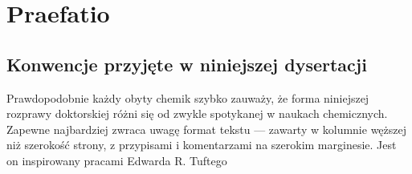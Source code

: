\chapter{Praefatio}
\section{Konwencje przyjęte w niniejszej dysertacji}

Prawdopodobnie każdy obyty chemik szybko zauważy, że forma niniejszej rozprawy doktorskiej różni się od zwykle spotykanej w naukach chemicznych.
Zapewne najbardziej zwraca uwagę format tekstu --- zawarty w kolumnie węższej niż szerokość strony, z przypisami i komentarzami na szerokim marginesie.
Jest on inspirowany pracami Edwarda R. Tuftego\cite{Tufte2001,Tufte1990,Tufte1997,Tufte2006}
